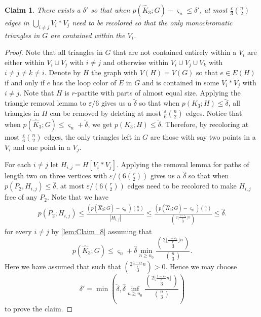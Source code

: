 \documentclass[a4paper,11pt]{article}
\newtheorem{claim}[theorem]{Claim}
\numberwithin{equation}{section}
\newcommand{\whiteboxedchar}[1]{
    \hspace{-2pt}\tikz[baseline=(char.base)]{
        \node[shape=rectangle, draw=black, thin, rounded corners=1.5pt, text=black, inner xsep=3pt, inner ysep=2pt] (char) {#1};
    }\hspace{-2pt}
}
\begin{document}
\begin{claim}\label{claim:f5}
    There exists a $\delta'$ so that when $p(\hat K_3;G)-\varsigma_n\le \delta'$, at most $\frac{\varepsilon}{3}\binom{n}{2}$ edges in $\bigcup_{i\ne j}V_i\ast V_j$ need to be recolored so that the only monochromatic triangles in $G$ are contained within the $V_i$.
\end{claim}
%
\begin{proof}
Note that all triangles in $G$ that are not contained entirely within a $V_i$ are either within $V_i\cup V_j$ with $i\ne j$ and otherwise within $V_i\cup V_j\cup V_k$ with $i\ne j\ne k\ne i$. 
Denote by $H$ the graph with $V(H)=V(G)$ so that $e\in E(H)$ if and only if $e$ has the loop color of $E$ in $G$ and is contained in some $V_i\ast V_j$ with $i\ne j$. Note that $H$ is $r$-partite with parts of almost equal size. Applying the triangle removal lemma to $\varepsilon/6$ gives us a $\tilde\delta$ so that when $p(K_3;H)\le \tilde\delta$, all triangles in $H$ can be removed by deleting at most $\frac{\varepsilon}{6}\binom{n}{2}$ edges. Notice that when $p(\hat K_3;G)\le \varsigma_n+\tilde\delta$, we get $p(K_3;H)\le \tilde\delta$. Therefore, by recoloring at most $\frac{\varepsilon}{6}\binom{n}{2}$ edges, the only triangles left in $G$ are those with say two points in a $V_i$ and one point in a $V_j$.

For each $i\ne j$ let $H_{i,j} = H[V_i\ast V_j]$. Applying the removal lemma for paths of length two on three vertices with $\varepsilon / (6\binom{r}{2})$ gives us a $\hat\delta$ so that when $p(P_2,H_{i,j})\le \hat \delta$, at most $\varepsilon / (6\binom{r}{2})$ edges need to be recolored to make $H_{i,j}$ free of any $P_2$. Note that we have
\begin{align*}
    p(P_2;H_{i,j}) \le \frac{(p(\hat K_3;G)-\varsigma_n)\binom{n}{3}}{|H_{i,j}|}
    \le \frac{(p(\hat K_3;G)-\varsigma_n)\binom{n}{3}}
        {\binom{2\lfloor\frac{1-\varepsilon_7}{r}\rfloor n}{3}}
    \le\hat \delta.
\end{align*}
%
for every $i\ne j$ by \cref{lem:Claim_8}  assuming that
%
\begin{equation*}
    p(\hat K_3;G) \le \varsigma_n +
        \hat\delta\min_{n\ge n_0}
            \frac{\binom{2\lfloor\frac{1-\varepsilon_7}{r}\rfloor n}{3}}{\binom{n}{3}}.
\end{equation*}
%
Here we have assumed that \whiteboxedchar{$n_0$ is large enough} such that $\binom{2\frac{1-\varepsilon_7}{r}n}{3} > 0$. Hence we may choose
\begin{equation*}
    \delta ' =  \operatorname{min} \left( \tilde\delta, \hat\delta\inf_{n\ge n_0}
            \frac{\binom{2\lfloor\frac{1-\varepsilon_7}{r}n\rfloor }{3}}{\binom{n}{3}} \right)
\end{equation*}
to prove the claim.
\end{proof}
\end{document}
